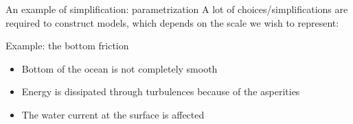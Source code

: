 \documentclass[10pt,aspectratio=169,usepdftitle=false]{beamer}
\begin{document}



  

  

\begin{frame}{An example of simplification: parametrization}
  A lot of choices/simplifications are required to construct models, which depends on
  the scale we wish to represent: 

  \begin{block}{Example: the bottom friction}
    \begin{itemize}
    \item Bottom of the ocean is not completely smooth
    \item Energy is dissipated through turbulences because of the asperities
    \item The water current at the surface is affected
    \end{itemize}
  \end{block}
  \begin{center}
    \scalebox{.9}{}
  \end{center}
\end{frame}
\end{document}
